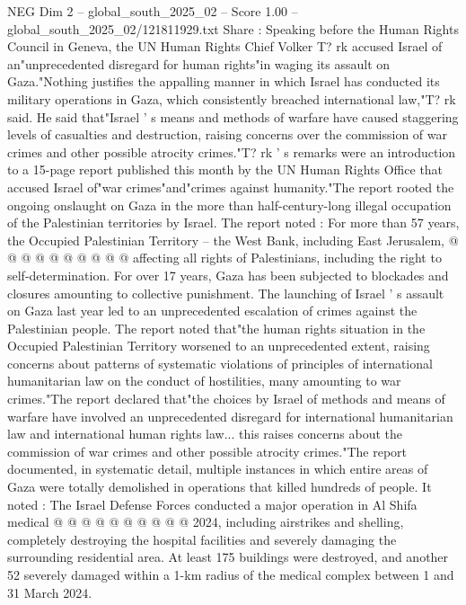 \begin{textsample}{NEG Dim 2 – global\_south\_2025\_02 – Score 1.00 – global\_south\_2025\_02/121811929.txt}  \label{ex:f2_neg_064}
Share : Speaking before the Human Rights Council in Geneva, the UN Human Rights Chief Volker T? rk accused Israel of an"unprecedented disregard for human rights"in waging its assault on Gaza."Nothing justifies the appalling manner in which Israel has conducted its military operations in Gaza, which consistently breached international law,"T? rk said.
He said that"Israel ' s means and methods of warfare have caused staggering levels of casualties and destruction, raising concerns over the commission of war crimes and other possible atrocity crimes."T? rk ' s remarks were an introduction to a 15-page report published this month by the UN Human Rights Office that accused Israel of"war crimes"and"crimes against humanity."The report rooted the ongoing onslaught on Gaza in the more than half-century-long illegal occupation of the Palestinian territories by Israel.
The report noted : For more than 57 years, the Occupied Palestinian Territory -- the West Bank, including East Jerusalem, @ @ @ @ @ @ @ @ @ @ affecting all rights of Palestinians, including the right to self-determination.
For over 17 years, Gaza has been subjected to blockades and closures amounting to collective punishment.
The launching of Israel ' s assault on Gaza last year led to an unprecedented escalation of crimes against the Palestinian people.
The report noted that"the human rights situation in the Occupied Palestinian Territory worsened to an unprecedented extent, raising concerns about patterns of systematic violations of principles of international humanitarian law on the conduct of hostilities, many amounting to war crimes."The report declared that"the choices by Israel of methods and means of warfare have involved an unprecedented disregard for international humanitarian law and international human rights law... this raises concerns about the commission of war crimes and other possible atrocity crimes."The report documented, in systematic detail, multiple instances in which entire areas of Gaza were totally demolished in operations that killed hundreds of people.
It noted : The Israel Defense Forces conducted a major operation in Al Shifa medical @ @ @ @ @ @ @ @ @ @ 2024, including airstrikes and shelling, completely destroying the hospital facilities and severely damaging the surrounding residential area.
At least 175 buildings were destroyed, and another 52 severely damaged within a 1-km radius of the medical complex between 1 and 31 March 2024.

\end{textsample}
